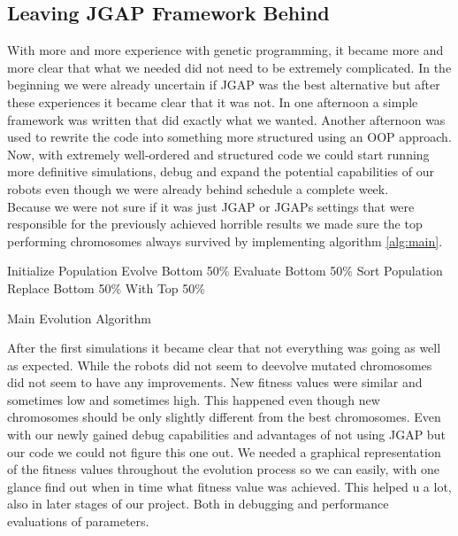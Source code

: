 \documentclass[a4paper,10pt]{article}
\begin{document}
\subsection{Leaving JGAP Framework Behind}
With more and more experience with genetic programming, it became more and more clear that what we needed did not need to be extremely complicated. In the beginning 
we were already uncertain if JGAP was the best alternative but after these experiences it became clear that it was not. In one afternoon a simple framework was written
that did exactly what we wanted. Another afternoon was used to rewrite the code into something more structured using an OOP approach. Now, with extremely well-ordered and
structured code we could start running more definitive simulations, debug and expand the potential capabilities of our robots even though we were already behind schedule
a complete week. \\

Because we were not sure if it was just JGAP or JGAPs settings that were responsible for the previously achieved
 horrible results we made sure the top performing 
chromosomes always survived by implementing algorithm \ref{alg:main}.


\begin{algorithm}
\begin{algorithmic}
\STATE Initialize Population
    \STATE Evolve Bottom 50\%
    \STATE Evaluate Bottom 50\%
    \STATE Sort Population 
    \STATE Replace Bottom 50\% With Top 50\%
\ENDWHILE
\end{algorithmic}
\caption{Main Evolution Algorithm}
\label{alg:main}
\end{algorithm}

After the first simulations it became clear that not everything was going as well as expected. While the robots did not seem to deevolve mutated chromosomes did not seem 
to have any improvements. New fitness values were similar and sometimes low and sometimes high. This happened even though new chromosomes should be only slightly different
from the best chromosomes. Even with our newly gained debug capabilities and advantages of not using JGAP but our code we could not figure this one out. We needed
a graphical representation of the fitness values throughout the evolution process so we can easily, with one glance find out when in time what fitness value was 
achieved. This helped u a lot, also in later stages of our project. Both in debugging and performance evaluations of parameters.  \\
\end{document}
